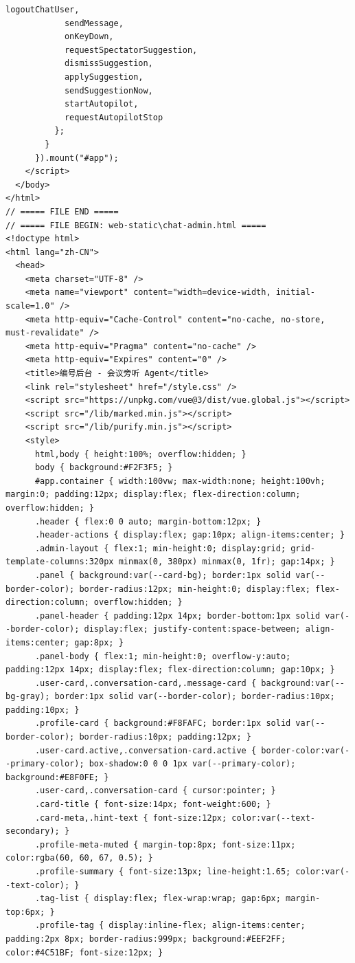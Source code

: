 \documentclass[12pt,a4paper]{article}
\begin{document}
\begin{Verbatim}[fontsize=\footnotesize]
            logoutChatUser,
            sendMessage,
            onKeyDown,
            requestSpectatorSuggestion,
            dismissSuggestion,
            applySuggestion,
            sendSuggestionNow,
            startAutopilot,
            requestAutopilotStop
          };
        }
      }).mount("#app");
    </script>
  </body>
</html>
// ===== FILE END =====
// ===== FILE BEGIN: web-static\chat-admin.html =====
<!doctype html>
<html lang="zh-CN">
  <head>
    <meta charset="UTF-8" />
    <meta name="viewport" content="width=device-width, initial-scale=1.0" />
    <meta http-equiv="Cache-Control" content="no-cache, no-store, must-revalidate" />
    <meta http-equiv="Pragma" content="no-cache" />
    <meta http-equiv="Expires" content="0" />
    <title>编号后台 - 会议旁听 Agent</title>
    <link rel="stylesheet" href="/style.css" />
    <script src="https://unpkg.com/vue@3/dist/vue.global.js"></script>
    <script src="/lib/marked.min.js"></script>
    <script src="/lib/purify.min.js"></script>
    <style>
      html,body { height:100%; overflow:hidden; }
      body { background:#F2F3F5; }
      #app.container { width:100vw; max-width:none; height:100vh; margin:0; padding:12px; display:flex; flex-direction:column; overflow:hidden; }
      .header { flex:0 0 auto; margin-bottom:12px; }
      .header-actions { display:flex; gap:10px; align-items:center; }
      .admin-layout { flex:1; min-height:0; display:grid; grid-template-columns:320px minmax(0, 380px) minmax(0, 1fr); gap:14px; }
      .panel { background:var(--card-bg); border:1px solid var(--border-color); border-radius:12px; min-height:0; display:flex; flex-direction:column; overflow:hidden; }
      .panel-header { padding:12px 14px; border-bottom:1px solid var(--border-color); display:flex; justify-content:space-between; align-items:center; gap:8px; }
      .panel-body { flex:1; min-height:0; overflow-y:auto; padding:12px 14px; display:flex; flex-direction:column; gap:10px; }
      .user-card,.conversation-card,.message-card { background:var(--bg-gray); border:1px solid var(--border-color); border-radius:10px; padding:10px; }
      .profile-card { background:#F8FAFC; border:1px solid var(--border-color); border-radius:10px; padding:12px; }
      .user-card.active,.conversation-card.active { border-color:var(--primary-color); box-shadow:0 0 0 1px var(--primary-color); background:#E8F0FE; }
      .user-card,.conversation-card { cursor:pointer; }
      .card-title { font-size:14px; font-weight:600; }
      .card-meta,.hint-text { font-size:12px; color:var(--text-secondary); }
      .profile-meta-muted { margin-top:8px; font-size:11px; color:rgba(60, 60, 67, 0.5); }
      .profile-summary { font-size:13px; line-height:1.65; color:var(--text-color); }
      .tag-list { display:flex; flex-wrap:wrap; gap:6px; margin-top:6px; }
      .profile-tag { display:inline-flex; align-items:center; padding:2px 8px; border-radius:999px; background:#EEF2FF; color:#4C51BF; font-size:12px; }
\end{Verbatim}
\end{document}

